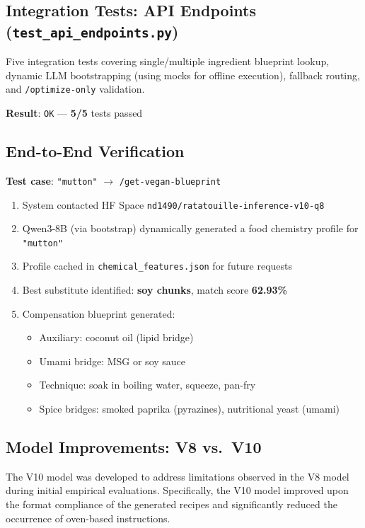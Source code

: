 \documentclass[12pt, a4paper]{article}
\begin{document}
\subsection{Integration Tests: API Endpoints (\texttt{test\_api\_endpoints.py})}

Five integration tests covering single/multiple ingredient blueprint lookup, dynamic LLM
bootstrapping (using mocks for offline execution), fallback routing, and
\texttt{/optimize-only} validation.

\begin{center}
\textbf{Result}: \texttt{OK} --- \textbf{5/5} tests passed
\end{center}

\subsection{End-to-End Verification}

\textbf{Test case}: \texttt{"mutton"} $\rightarrow$ \texttt{/get-vegan-blueprint}

\begin{enumerate}
  \item System contacted HF Space \texttt{nd1490/ratatouille-inference-v10-q8}
  \item Qwen3-8B (via bootstrap) dynamically generated a food chemistry profile for \texttt{"mutton"}
  \item Profile cached in \texttt{chemical\_features.json} for future requests
  \item Best substitute identified: \textbf{soy chunks}, match score \textbf{62.93\%}
  \item Compensation blueprint generated:
    \begin{itemize}
      \item Auxiliary: coconut oil (lipid bridge)
      \item Umami bridge: MSG or soy sauce
      \item Technique: soak in boiling water, squeeze, pan-fry
      \item Spice bridges: smoked paprika (pyrazines), nutritional yeast (umami)
    \end{itemize}
\end{enumerate}

\subsection{Model Improvements: V8 vs.\ V10}

The V10 model was developed to address limitations observed in the V8 model during initial empirical evaluations. Specifically, the V10 model improved upon the format compliance of the generated recipes and significantly reduced the occurrence of oven-based instructions.
\end{document}
